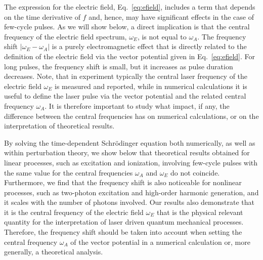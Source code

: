 The expression for the electric field, Eq.~\ref{eq:efield}, includes a term that depends on the time derivative of $f$ and, hence, may have significant effects in the case of few-cycle pulses. As we will show below, a direct implication is that the central frequency of the electric field spectrum, $\omega_E$, is not equal to $\omega_A$. The frequency shift $|\omega_E - \omega_A|$ is a purely electromagnetic effect that is directly related to the definition of the electric field via the vector potential given in Eq.\ \ref{eq:efield}. For long pulses, the frequency shift is small, but it increases as pulse duration decreases. Note, that in experiment typically the central laser frequency of the electric field $\omega_E$ is measured and reported, while in numerical calculations it is useful to define the laser pulse via the vector potential and the related central frequency $\omega_A$. It is therefore important to study what impact, if any, the difference between the central frequencies has on numerical calculations, or on the interpretation of theoretical results. 

By solving the time-dependent Schr\"odinger equation both numerically, as well as within perturbation theory, we show below that theoretical results obtained for linear processes, such as excitation and ionization, involving few-cycle pulses with the same value for the central frequencies $\omega_A$ and $\omega_E$ do not coincide. Furthermore, we find that the frequency shift is also noticeable for nonlinear processes, such as two-photon excitation and high-order harmonic generation, and it scales with the number of photons involved. Our results also demonstrate that it is the central frequency of the electric field $\omega_E$ that is the physical relevant quantity for the interpretation of laser driven quantum mechanical processes. Therefore, the frequency shift should be taken into account when setting the central frequency $\omega_A$ of the vector potential in a numerical calculation or, more generally, a theoretical analysis.


